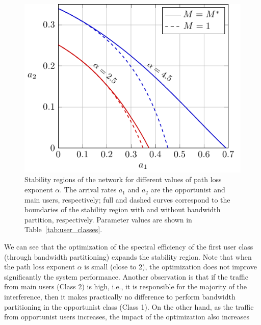 \begin{figure}[!t]
	\centering
	\includegraphics[]{./Figures/Ch7_optimum_stab_region.pdf}%
	\caption{Stability regions of the network for different values of path loss exponent $\alpha$. The arrival rates $a_1$ and $a_2$ are the opportunist and main users, respectively; full and dashed curves correspond to the boundaries of the stability region with and without bandwidth partition, respectively. Parameter values are shown in Table~\ref{tab:user_classes}.}
	\label{fig:optimum_stab_region}
\end{figure}
%
We can see that the optimization of the spectral efficiency of the first user class (through bandwidth partitioning) expands the stability region. Note that when the path loss exponent $\alpha$ is small (close to 2), the optimization does not improve significantly the system performance.
%
Another observation is that if the traffic from main users (Class 2) is high, i.e., it is responsible for the majority of the interference, then it makes practically no difference to perform bandwidth partitioning in the opportunist class (Class 1). On the other hand, as the traffic from opportunist users increases, the impact of the optimization also increases

